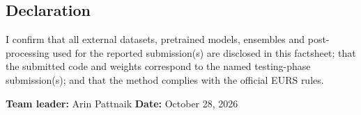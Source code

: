 \documentclass{article}
\begin{document}
\subsection*{Declaration}
I confirm that all external datasets, pretrained models, ensembles and post-processing used for the reported submission(s) are disclosed in this factsheet; that the submitted code and weights correspond to the named testing-phase submission(s); and that the method complies with the official EURS rules.

\vspace{0.8cm}
\noindent \textbf{Team leader:} Arin Pattnaik \hfill \textbf{Date:} October 28, 2026

\bigskip
{\small


}
\end{document}
